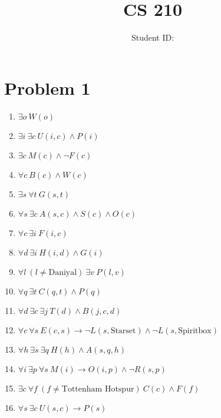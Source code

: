 \documentclass{article}
\title{CS 210 \hwNo}
\author{\myname \qquad Student ID: \myid}
\date{\currentdate}
\begin{document}
\maketitle

\section*{Problem 1}
\begin{enumerate}
    \item %
    $\exists o \  W(o)$
    
    \item %
    $\exists i \  \exists c \ U(i, c) \land P(i)$
    
    \item %
    $\exists c \ M(c) \land \lnot F(c)$

    \item %
    $\forall c \ B(c) \land W(c)$

    \item %
    $\exists s \ \forall t \ G(s, t)$

    \item %
    $\forall s \ \exists c \ A(s, c) \land S(c) \land O(c)$

    \item %
    $\forall c \ \exists i \ F(i, c)$

    \item %
    $\forall d \ \exists i \ H(i, d) \land G(i)$

    \item %
    $\forall l \ (l \neq \text{Daniyal}) \ \exists v \ P(l, v)$

    \item %
    $\forall q \ \exists t \ C(q, t) \land P(q)$

    \item %
    $\forall d \ \exists c \ \exists j \ T(d) \land B(j, c, d)$

    \item %
    $\forall c \ \forall s \ E(c, s) \to \lnot L(s, \text{Starset}) \land \lnot L(s, \text{Spiritbox})$

    \item %
    $\forall h \ \exists s \ \exists q \ H(h) \land A(s, q, h)$

    \item %
    $\forall i \ \exists p \ \forall s \ M(i) \to O(i, p) \land \lnot R(s, p)$

    \item %
    $\exists c \ \forall f \ (f \neq \text{Tottenham Hotspur}) \ C(c) \land F(f)$

    \item %
    $\forall s \ \exists c \ U(s, c) \to P(s)$

\end{enumerate}
\end{document}
